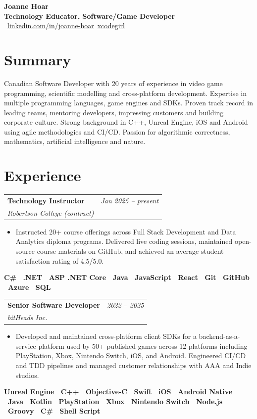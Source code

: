 \documentclass[10pt]{article}
\makeatletter
\newcommand{\tech}[1]{\textcolor{secondary}{\textbf{#1}}}
\newcommand{\experience}[4]{%
  \vspace{4pt}
  \begin{tabular*}{\textwidth}{@{}l@{\extracolsep{\fill}}r@{}}
    \textbf{#1} & \textit{#2} \\
    \textit{\small#3} & \textit{\small#4}
  \end{tabular*}
  \vspace{-4pt}
}
\makeatother
\begin{document}
\begin{center}
    {\Huge \textbf{Joanne Hoar}} \\[4pt]
    {\Large \tech{Technology Educator, Software/Game Developer}} \\[6pt]
    ~\href{https://linkedin.com/in/joanne-hoar/}{linkedin.com/in/joanne-hoar}\hfill {}~\href{https://github.com/xcodegirl}{xcodegirl}
\end{center}

\section*{Summary}

Canadian Software Developer with 20 years of experience in video game programming, scientific modelling and cross-platform development. Expertise in multiple programming languages, game engines and SDKs. Proven track record in leading teams, mentoring developers, impressing customers and building corporate culture. Strong background in C++, Unreal Engine, iOS and Android using agile methodologies and CI/CD. Passion for algorithmic correctness, mathematics, artificial intelligence and nature.

\section*{Experience}

\experience{Technology Instructor}{Jan 2025 -- present}{Robertson College (contract)}{}
\begin{itemize}
    \item Instructed 20+ course offerings across Full Stack Development and Data Analytics diploma programs. Delivered live coding sessions, maintained open-source course materials on GitHub, and achieved an average student satisfaction rating of 4.5/5.0.
\end{itemize}
\textbf{\tech{C\#} \textbullet\ \tech{.NET} \textbullet\ \tech{ASP .NET Core} \textbullet\ \tech{Java} \textbullet\ \tech{JavaScript} \textbullet\ \tech{React} \textbullet\ \tech{Git} \textbullet\ \tech{GitHub} \textbullet\ \tech{Azure} \textbullet\ \tech{SQL}}

\experience{Senior Software Developer}{2022 -- 2025}{bitHeads Inc.}{}
\begin{itemize}
    \item Developed and maintained cross-platform client SDKs for a backend-as-a-service platform used by 50+ published games across 12 platforms including PlayStation, Xbox, Nintendo Switch, iOS, and Android. Engineered CI/CD and TDD pipelines and managed customer relationships with AAA and Indie studios.
\end{itemize}
\textbf{\tech{Unreal Engine} \textbullet\ \tech{C++} \textbullet\ \tech{Objective-C} \textbullet\ \tech{Swift} \textbullet\ \tech{iOS} \textbullet\ \tech{Android Native} \textbullet\ \tech{Java} \textbullet\ \tech{Kotlin} \textbullet\ \tech{PlayStation} \textbullet\ \tech{Xbox} \textbullet\ \tech{Nintendo Switch} \textbullet\ \tech{Node.js} \textbullet\ \tech{Groovy} \textbullet\ \tech{C\#} \textbullet\ \tech{Shell Script}}
\end{document}
